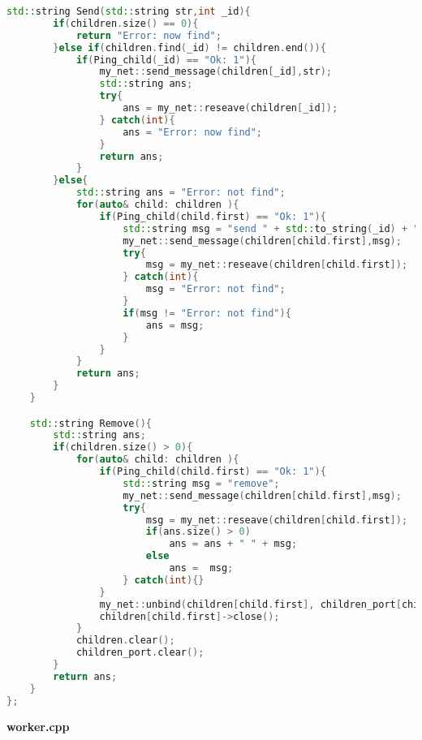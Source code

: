 \documentclass[pdf, unicode, 12pt, a4paper,oneside,fleqn]{article}
\begin{document}
\begin{lstlisting}[language=C++]
    std::string Send(std::string str,int _id){
        if(children.size() == 0){
            return "Error: now find";
        }else if(children.find(_id) != children.end()){
            if(Ping_child(_id) == "Ok: 1"){
                my_net::send_message(children[_id],str);
                std::string ans;
                try{
                    ans = my_net::reseave(children[_id]);
                } catch(int){
                    ans = "Error: now find";
                }
                return ans;
            }
        }else{
            std::string ans = "Error: not find";
            for(auto& child: children ){
                if(Ping_child(child.first) == "Ok: 1"){
                    std::string msg = "send " + std::to_string(_id) + " " + str;
                    my_net::send_message(children[child.first],msg);
                    try{
                        msg = my_net::reseave(children[child.first]);
                    } catch(int){
                        msg = "Error: not find";
                    }
                    if(msg != "Error: not find"){
                        ans = msg;
                    }
                }
            }
            return ans;
        }
    }

    std::string Remove(){
        std::string ans;
        if(children.size() > 0){
            for(auto& child: children ){
                if(Ping_child(child.first) == "Ok: 1"){
                    std::string msg = "remove";
                    my_net::send_message(children[child.first],msg);
                    try{
                        msg = my_net::reseave(children[child.first]);
                        if(ans.size() > 0)
                            ans = ans + " " + msg;
                        else
                            ans =  msg;
                    } catch(int){}
                }
                my_net::unbind(children[child.first], children_port[child.first]);
                children[child.first]->close();
            }
            children.clear();
            children_port.clear();
        }
        return ans;
    }
};       
\end{lstlisting}

{\large\textbf{worker.cpp}}
\end{document}
